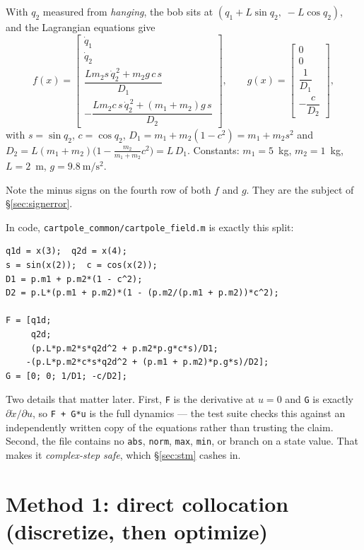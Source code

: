 \documentclass[11pt]{article}
\newcommand{\file}[1]{\texttt{#1}}
\begin{document}
\begin{rig}
With $q_2$ measured from \emph{hanging}, the bob sits at
$(q_1+L\sin q_2,\;-L\cos q_2)$, and the Lagrangian equations give
\[
f(x)=\begin{bmatrix}\dot q_1\\[2pt] \dot q_2\\[4pt]
\dfrac{Lm_2 s\,\dot q_2^{\,2}+m_2 g\,c\,s}{D_1}\\[10pt]
-\dfrac{Lm_2 c\,s\,\dot q_2^{\,2}+(m_1+m_2)g\,s}{D_2}\end{bmatrix},
\qquad
g(x)=\begin{bmatrix}0\\0\\ \dfrac{1}{D_1}\\[8pt] -\dfrac{c}{D_2}\end{bmatrix},
\]
with $s=\sin q_2$, $c=\cos q_2$, $D_1=m_1+m_2(1-c^2)=m_1+m_2 s^2$ and
$D_2=L(m_1+m_2)\bigl(1-\tfrac{m_2}{m_1+m_2}c^2\bigr)=L\,D_1$. Constants:
$m_1=5$~kg, $m_2=1$~kg, $L=2$~m, $g=9.8~\mathrm{m/s^2}$.

Note the minus signs on the fourth row of both $f$ and $g$. They are the subject
of \S\ref{sec:signerror}.

In code, \file{cartpole\_common/cartpole\_field.m} is exactly this split:

\begin{lstlisting}
q1d = x(3);  q2d = x(4);
s = sin(x(2));  c = cos(x(2));
D1 = p.m1 + p.m2*(1 - c^2);
D2 = p.L*(p.m1 + p.m2)*(1 - (p.m2/(p.m1 + p.m2))*c^2);

F = [q1d;
     q2d;
     (p.L*p.m2*s*q2d^2 + p.m2*p.g*c*s)/D1;
    -(p.L*p.m2*c*s*q2d^2 + (p.m1 + p.m2)*p.g*s)/D2];
G = [0; 0; 1/D1; -c/D2];
\end{lstlisting}

Two details that matter later. First, \texttt{F} is the derivative at $u=0$ and
\texttt{G} is exactly $\partial\dot x/\partial u$, so \texttt{F + G*u} is the full
dynamics --- the test suite checks this against an independently written copy of
the equations rather than trusting the claim. Second, the file contains no
\texttt{abs}, \texttt{norm}, \texttt{max}, \texttt{min}, or branch on a state
value. That makes it \emph{complex-step safe}, which \S\ref{sec:stm} cashes in.
\end{rig}

\section{Method 1: direct collocation (discretize, then optimize)}
\end{document}

